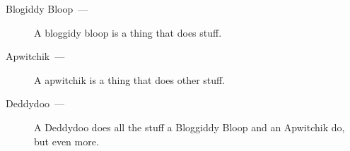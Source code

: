 \documentclass{article}
\newcommand{\descitem}[1][Item]{\item[#1~---]}%
\begin{document}
\begin{description}
	\descitem[Blogiddy Bloop] A bloggidy bloop is a thing that does stuff.
	\descitem[Apwitchik] A apwitchik is a thing that does other stuff.
	\descitem[Deddydoo] A Deddydoo does all the stuff a Bloggiddy Bloop and an Apwitchik do, but even more.
\end{description}
\end{document}
